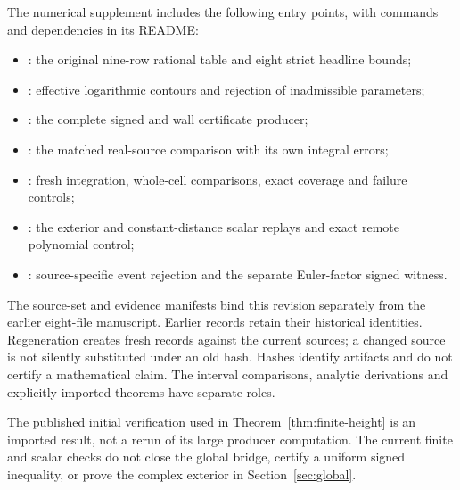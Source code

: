 The numerical supplement \cite{Artifacts} includes the following
entry points, with commands and dependencies in its README:
\begin{itemize}
\item {}: the original nine-row
rational table and eight strict headline bounds;
\item {}: effective logarithmic
contours and rejection of inadmissible parameters;
\item {}: the complete signed and wall
certificate producer;
\item {}: the matched real-source
comparison with its own integral errors;
\item {}: fresh integration,
whole-cell comparisons, exact coverage and failure controls;
\item {}: the exterior and
constant-distance scalar replays and exact remote polynomial control;
\item {}: source-specific event
rejection and the separate Euler-factor signed witness.
\end{itemize}
The source-set and evidence manifests bind this revision separately
from the earlier eight-file manuscript. Earlier records retain their
historical identities. Regeneration creates fresh records against the
current sources; a changed source is not silently substituted under an
old hash. Hashes identify artifacts and do not certify a mathematical
claim. The interval comparisons, analytic derivations and explicitly
imported theorems have separate roles.

The published initial verification used in
Theorem~\ref{thm:finite-height} is an imported result, not a rerun of
its large producer computation. The current finite and scalar checks
do not close the global bridge, certify a uniform signed inequality,
or prove the complex exterior in Section~\ref{sec:global}.
